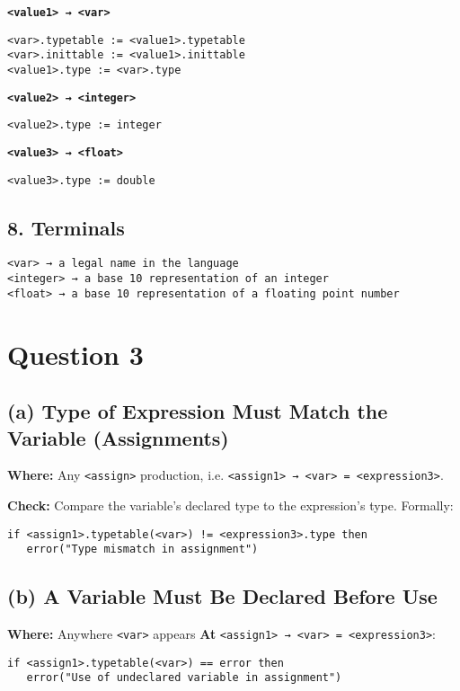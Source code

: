 \documentclass[12pt]{article}
\begin{document}
    \textbf{\texttt{<value1> → <var>}}
    \begin{verbatim}
<var>.typetable := <value1>.typetable
<var>.inittable := <value1>.inittable
<value1>.type := <var>.type
    \end{verbatim}

    \textbf{\texttt{<value2> → <integer>}}
    \begin{verbatim}
<value2>.type := integer
    \end{verbatim}

    \textbf{\texttt{<value3> → <float>}}
    \begin{verbatim}
<value3>.type := double
    \end{verbatim}

    \subsection*{8. Terminals}

    \begin{verbatim}
<var> → a legal name in the language
<integer> → a base 10 representation of an integer
<float> → a base 10 representation of a floating point number
    \end{verbatim}

    \section*{Question 3}

    \subsection*{(a) Type of Expression Must Match the Variable (Assignments)}

    \textbf{Where:} Any \texttt{<assign>} production, i.e. \texttt{<assign1> → <var> = <expression3>}.

    \textbf{Check:} Compare the variable’s declared type to the expression’s type. Formally:
    \begin{verbatim}
if <assign1>.typetable(<var>) != <expression3>.type then
   error("Type mismatch in assignment")
    \end{verbatim}

    \subsection*{(b) A Variable Must Be Declared Before Use}

    \textbf{Where:} Anywhere \texttt{<var>} appears
    \textbf{At} \texttt{<assign1> → <var> = <expression3>}:
    \begin{verbatim}
if <assign1>.typetable(<var>) == error then
   error("Use of undeclared variable in assignment")
    \end{verbatim}
\end{document}

